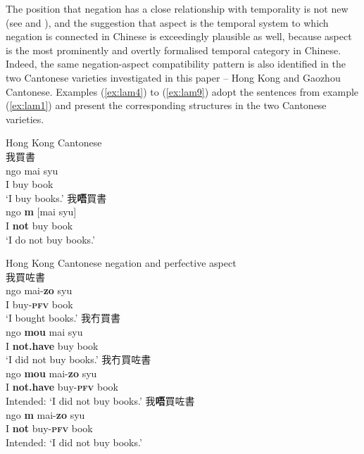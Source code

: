 \documentclass[output=paper]{langscibook}
\begin{document}
The position that negation has a close relationship with temporality is not new (see \citealt{Zanuttini2001} and \citealt{Miestamo2005}), and the suggestion that aspect is the temporal system to which negation is connected in Chinese is exceedingly plausible as well, because aspect is the most prominently and overtly formalised temporal category in Chinese. Indeed, the same negation-aspect compatibility pattern is also identified in the two Cantonese varieties investigated in this paper – Hong Kong and Gaozhou Cantonese. Examples (\ref{ex:lam4}) to (\ref{ex:lam9}) adopt the sentences from example (\ref{ex:lam1}) and present the corresponding structures in the two Cantonese varieties.

\ea Hong Kong Cantonese \label{ex:lam4}\\
  \ea 我買書 \label{ex:lam4a}\\
    \gll ngo	mai	syu\\
	I buy book\\
	\glt `I buy books.'
  \ex 我\textbf{唔}買書 \label{ex:lam4b}\\
    \gll ngo	 \textbf{m} [mai syu]\\ 
	I \textbf{not} buy book\\
	\glt `I do not buy books.'
\z \z


\ea Hong Kong Cantonese negation and perfective aspect \label{ex:lam5}\\
  \ea 我買咗書 \label{ex:lam5a}\\
    \gll ngo mai-\textbf{zo} syu\\
	I buy-\textbf{\textsc{pfv}} book\\
	\glt `I bought books.'
  \ex 我冇買書 \label{ex:lam5b}\\
    \gll ngo \textbf{mou} mai syu\\
	I \textbf{not.have} buy book\\
	\glt `I did not buy books.'
  \ex 我冇買咗書 \label{ex:lam5c}\\
  	\gll *ngo \textbf{mou} mai-\textbf{zo} syu\\
	I \textbf{not.have} buy-\textbf{\textsc{pfv}} book\\
	\glt Intended: `I did not buy books.'
  \ex 我\textbf{唔}買咗書 \label{ex:lam5d}\\
  	\gll *ngo \textbf{m} mai-\textbf{zo} syu\\
  	I \textbf{not} buy-\textbf{\textsc{pfv}} book\\
  	\glt Intended: `I did not buy books.'
\z \z
\end{document}
